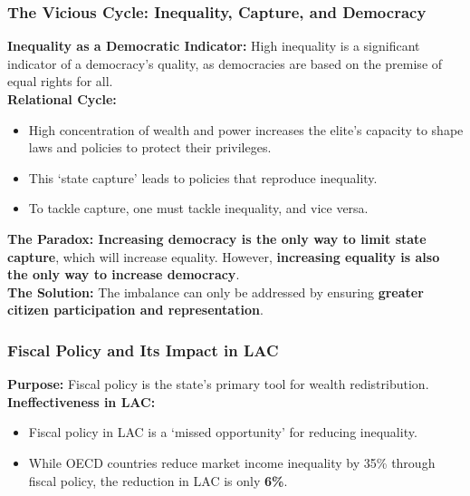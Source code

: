\documentclass{article}
\begin{document}
    \subsubsection{The Vicious Cycle: Inequality, Capture, and Democracy}

    \noindent \textbf{Inequality as a Democratic Indicator:}  High
inequality is a significant indicator of a democracy's quality, as
democracies are based on the premise of equal rights for all.\\

    \noindent \textbf{Relational Cycle:}
    \begin{itemize}
        \item High concentration of wealth and power increases the elite's
        capacity to shape laws and policies to protect their privileges.
        \item This `state capture' leads to policies that reproduce inequality.
        \item To tackle capture, one must tackle inequality, and vice versa.
    \end{itemize}

    \noindent
\textbf{The Paradox: Increasing democracy is the only way to limit state capture}, which will increase equality. However, \textbf{increasing equality is also the only way to increase democracy}.\\

    \noindent \textbf{The Solution:} The imbalance can only be addressed by
ensuring \textbf{greater citizen participation and representation}.

    \subsubsection{Fiscal Policy and Its Impact in LAC}

    \noindent \textbf{Purpose:} Fiscal policy is the state's primary tool
for wealth redistribution.\\

    \noindent \textbf{Ineffectiveness in LAC:}
    \begin{itemize}
        \item Fiscal policy in LAC is a `missed opportunity' for reducing
        inequality.
        \item While OECD countries reduce market income inequality by 35\%
        through fiscal policy, the reduction in LAC is only \textbf{6\%}.
    \end{itemize}
\end{document}
